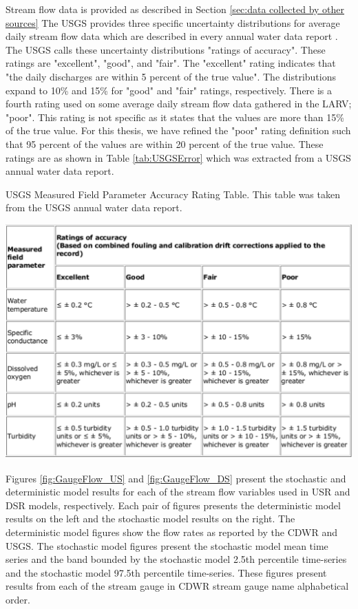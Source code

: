 \begin{linenumbers}
Stream flow data is provided as described in Section \ref{sec:data collected by other sources}  The USGS provides three specific uncertainty distributions for average daily stream flow data which are described in every annual water data report \parencite{USGS2006NWIS, USGS2007NWIS, USGS2008NWIS, USGS2009NWIS, USGS2010NWIS, USGS2011NWIS, USGS2012NWIS}.  The USGS calls these uncertainty distributions "ratings of accuracy".  These ratings are "excellent", "good", and "fair".  The "excellent" rating indicates that "the daily discharges are within 5 percent of the true value".  The distributions expand to 10\% and 15\% for "good" and "fair" ratings, respectively.  There is a fourth rating used on some average daily stream flow data gathered in the LARV; "poor".  This rating is not specific as it states that the values are more than 15\% of the true value.  For this thesis, we have refined the "poor" rating definition such that 95 percent of the values are within 20 percent of the true value.  These ratings are as shown in Table \ref{tab:USGSError} which was extracted from a USGS annual water data report.

\begin{table}[htbp]
	\caption[USGS Measured Field Parameter Accuracy Rating Table.]{USGS Measured Field Parameter Accuracy Rating Table.  This table was taken from the USGS annual water data report. }
	\label{tab:USGSError}
	\includegraphics[width=6in]{"Figures/USGS_error_table"}
\end{table}

Figures \ref{fig:GaugeFlow_US} and \ref{fig:GaugeFlow_DS} present the stochastic and deterministic model results for each of the stream flow variables used in USR and DSR models, respectively.  Each pair of figures presents the deterministic model results on the left and the stochastic model results on the right.  The deterministic model figures show the flow rates as reported by the CDWR and USGS.  The stochastic model figures present the stochastic model mean time series and the band bounded by the stochastic model 2.5th percentile time-series and the stochastic model 97.5th percentile time-series.  These figures present results from each of the stream gauge in CDWR stream gauge name alphabetical order.


\end{linenumbers}
